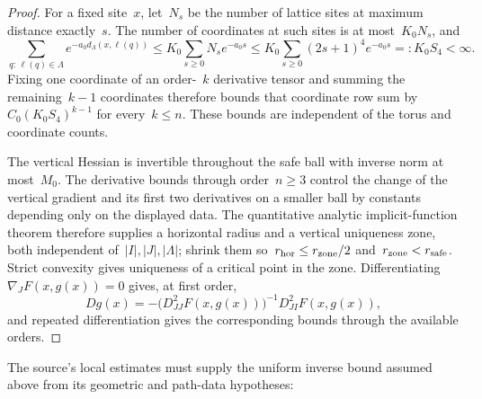 \begin{proof}
For a fixed site~$x$, let~$N_s$ be the number of lattice sites at maximum distance exactly~$s$. The number of coordinates at such sites is at most~$K_0N_s$, and
\begin{equation*}
 \sum_{q:\,\ell(q)\in\Lambda}
 e^{-a_0d_\Lambda(x,\ell(q))}
 \le K_0\sum_{s\ge0}N_se^{-a_0s}
 \le K_0\sum_{s\ge0}(2s+1)^4e^{-a_0s}=:K_0S_4<\infty.
\end{equation*}
Fixing one coordinate of an order-~$k$ derivative tensor and summing the remaining~$k-1$ coordinates therefore bounds that coordinate row sum by~$C_0(K_0S_4)^{k-1}$ for every~$k\le n$. These bounds are independent of the torus and coordinate counts.

The vertical Hessian is invertible throughout the safe ball with inverse norm at most~$M_0$. The derivative bounds through order~$n\ge3$ control the change of the vertical gradient and its first two derivatives on a smaller ball by constants depending only on the displayed data. The quantitative analytic implicit-function theorem therefore supplies a horizontal radius and a vertical uniqueness zone, both independent of~$|I|,|J|,|\Lambda|$; shrink them so~$r_{\rm hor}\le r_{\rm zone}/2$ and~$r_{\rm zone}<r_{\rm safe}$. Strict convexity gives uniqueness of a critical point in the zone. Differentiating~$\nabla_JF(x,g(x))=0$ gives, at first order,
\begin{equation*}
 Dg(x)=-\bigl(D^2_{JJ}F(x,g(x))\bigr)^{-1}D^2_{JI}F(x,g(x)),
\end{equation*}
and repeated differentiation gives the corresponding bounds through the available orders.
\end{proof}

The source's local estimates must supply the uniform inverse bound assumed above from its geometric and path-data hypotheses:

